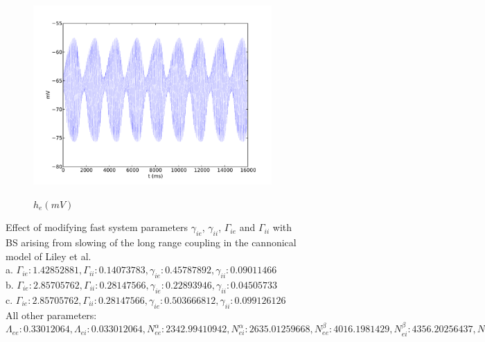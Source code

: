 \documentclass[a4paper,12pt]{article}
\begin{document}
\begin{figure}
\begin{subfigure}[b]{0.3\textwidth}
		\includegraphics[scale=0.22]{chosen-frontiers-2012/00416-1_1-2-1-he-phi.pdf}
		\label{fig:416_phi_c}
		\caption{$h_e (mV)$}
	\end{subfigure}

	\label{fig:phi_fast_var}
	\caption{Effect of modifying fast system parameters $\gamma_{ie}$, $\gamma_{ii}$, $\Gamma_{ie}$ and $\Gamma_{ii}$ with BS arising from slowing of the long range coupling in the cannonical model of Liley et al.\\
	a. $\Gamma_{ie}: 1.42852881, \Gamma_{ii}: 0.14073783, \gamma_{ie}: 0.45787892, \gamma_{ii}: 0.09011466$ \\
	b. $\Gamma_{ie}: 2.85705762, \Gamma_{ii}: 0.28147566, \gamma_{ie}: 0.22893946,  \gamma_{ii}: 0.04505733$\\
	c. $\Gamma_{ie}: 2.85705762, \Gamma_{ii}: 0.28147566, \gamma_{ie}: 0.503666812,  \gamma_{ii}: 0.099126126$\\
All other parameters:\\
$\Lambda_{ee}: 0.33012064, \Lambda_{ei}: 0.033012064, N^{\alpha}_{ee}: 2342.99410942, N^{\alpha}_{ei}: 2635.01259668,
N^{\beta}_{ee}: 4016.1981429, N^{\beta}_{ei}: 4356.20256437, N^{\beta}_{ie}: 634.73935613, N^{\beta}_{ii}: 473.38388612,
\Gamma_{ee}: 0.13699266, \Gamma_{ei}: 0.4439827, \gamma_{ee}: 0.244953287255, \gamma_{ei}: 0.82969594, h^{rest}_e: -61.7485641, h^{eq}_{ee}: 5.73011624, h^{eq}_{ei}: 2.099135,
h^{rest}_i: -64.46142322, h^{eq}_{ie}: -81.67044311, h^{eq}_{ii}: -82.29433835, \mu_e: -53.10048735, \mu_i: -53.68380602, p_{ee}: 3.6997382629, p_{ei}: 0.60015865013, p_{ie}: 0.0, p_{ii}: 0.0, \phi_{ie}: 0,
\phi_{ii}: 0, S^{max}_e: 0.0930382, S^{max}_i: 0.0648537, \sigma_e: 4.64535035,
\sigma_i: 3.10925431, \tau_e: 86.1876, \tau_i: 65.0391, v_{ee}: 0.160606, v_{ei}: 0.160606$
}

\end{figure}
\end{document}

